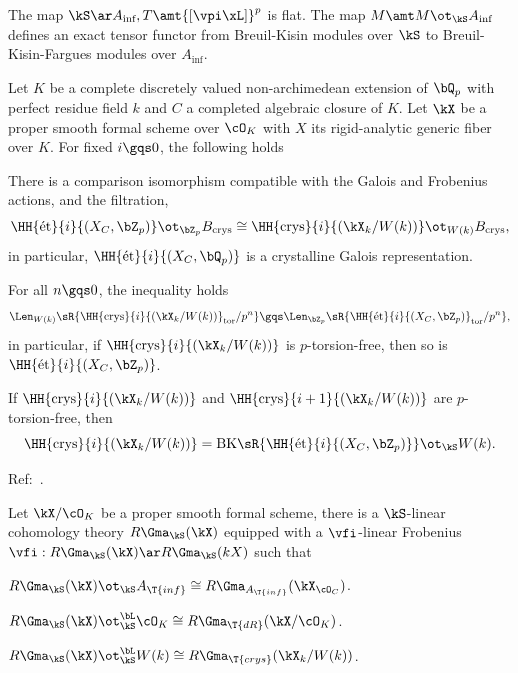 \documentclass[a4paper, twoside]{article}
\begin{document}
\begin{thm}
	The map $\kS\ar A_{\text{inf}}, T\amt{[\vpi\xL]}^{p}$ is flat. The map $M\amt M\ot_{\kS}A_{\text{inf}}$ defines an exact tensor functor from Breuil-Kisin modules over $\kS$ to Breuil-Kisin-Fargues modules over $A_{\text{inf}}$.
\end{thm}

\begin{thm}
	Let $K$ be a complete discretely valued non-archimedean extension of $\bQ_{p}$ with perfect residue field $k$ and $C$ a completed algebraic closure of $K$. Let $\kX$ be a proper smooth formal scheme over $\cO_{K}$ with $X$ its rigid-analytic generic fiber over $K$. For fixed $i\gqs0$, the following holds
	\begin{enr}[label=(\arabic*)]
		\item There is a comparison isomorphism compatible with the Galois and Frobenius actions, and the filtration,
		\[
			\HH{\text{{\'e}t}}{i}{(X_{C},\bZ_{p})}\ot_{\bZ_{p}}B_{\text{crys}}\cong\HH{\text{crys}}{i}{(\kX_{k}/W(k))}\ot_{W(k)}B_{\text{crys}},
		\]
		in particular, $\HH{\text{{\'e}t}}{i}{(X_{C},\bQ_{p})}$ is a crystalline Galois representation.
		\item For all $n\gqs0$, the inequality holds
		\[
			\Len_{W(k)}\sR{\HH{\text{crys}}{i}{(\kX_{k}/W(k))}_{\text{tor}}/p^{n}}\gqs\Len_{\bZ_{p}}\sR{\HH{\text{{\'e}t}}{i}{(X_{C},\bZ_{p})}_{\text{tor}}/p^{n}},
		\]
		in particular, if $\HH{\text{crys}}{i}{(\kX_{k}/W(k))}$ is $p$-torsion-free, then so is $\HH{\text{{\'e}t}}{i}{(X_{C},\bZ_{p})}$.
		\item If $\HH{\text{crys}}{i}{(\kX_{k}/W(k))}$ and $\HH{\text{crys}}{i+1}{(\kX_{k}/W(k))}$ are $p$-torsion-free, then
		\[
			\HH{\text{crys}}{i}{(\kX_{k}/W(k))}= \mathrm{BK}\sR{\HH{\text{{\'e}t}}{i}{(X_{C},\bZ_{p})}}\ot_{\kS}W(k).
		\]
	\end{enr}
\end{thm}


Ref:~\cite{BMS2019}.

\begin{thm}
	Let $\kX/\cO_{K}$ be a proper smooth formal scheme, there is a $\kS$-linear cohomology theory $R\Gma_{\kS}(\kX)$ equipped with a $\vfi$-linear Frobenius $\vfi:R\Gma_{\kS}(\kX)\ar R\Gma_{\kS}(kX)$ such that
	\begin{enr}[label=(\arabic*)]
		\item $R\Gma_{\kS}(\kX)\ot_{\kS}A_{\T{inf}}\cong R\Gma_{A_{\T{inf}}}(\kX_{\cO_{C}})$.
		\item $R\Gma_{\kS}(\kX)\ot_{\kS}^{\bL}\cO_{K}\cong R\Gma_{\T{dR}}(\kX/\cO_{K})$.
		\item $R\Gma_{\kS}(\kX)\ot_{\kS}^{\bL}W(k)\cong R\Gma_{\T{crys}}(\kX_{k}/W(k))$.
	\end{enr}
\end{thm}
\end{document}
